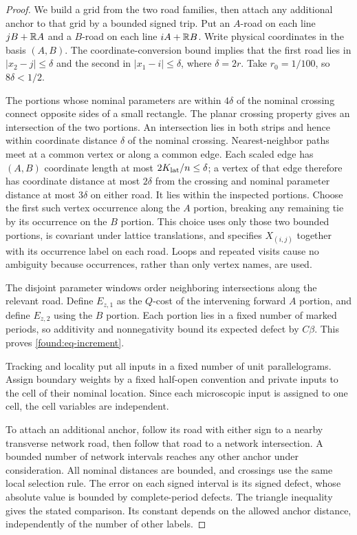 \begin{proof}
We build a grid from the two road families, then attach any additional
anchor to that grid by a bounded signed trip.  Put an $A$-road on each
line $jB+\mathbb R A$ and a $B$-road on each
line $iA+\mathbb R B$.  Write physical coordinates in the basis $(A,B)$.
The coordinate-conversion bound implies that the first road lies in
$|x_2-j|\leq\delta$ and the second in $|x_1-i|\leq\delta$, where
$\delta=2r$.  Take $r_0=1/100$, so $8\delta<1/2$.

The portions whose nominal parameters are within $4\delta$ of the
nominal crossing connect opposite sides of a small rectangle.
The planar crossing property gives an intersection of the two portions.
An intersection lies in both strips and hence within coordinate
distance $\delta$ of the nominal crossing.  Nearest-neighbor paths
meet at a common vertex or along a common edge.  Each scaled edge has
$(A,B)$ coordinate length at most $2K_{\rm lat}/n\leq\delta$; a vertex
of that edge therefore has coordinate distance at most $2\delta$
from the crossing and nominal parameter distance at most $3\delta$
on either road.  It lies within the inspected portions.  Choose the
first such vertex occurrence along the
$A$ portion, breaking any remaining tie by its occurrence on the $B$
portion.  This choice uses only those two bounded portions, is covariant
under lattice translations, and specifies $X_{(i,j)}$ together with its
occurrence label on each road.  Loops and repeated visits cause no
ambiguity because occurrences, rather than only vertex names, are used.

The disjoint parameter windows order neighboring intersections along
the relevant road.  Define $E_{z,1}$ as the $Q$-cost of the intervening
forward $A$ portion, and define $E_{z,2}$ using the $B$ portion.
Each portion lies in a fixed number of marked periods, so additivity
and nonnegativity bound its expected defect by $C\beta$.  This proves
\eqref{found:eq-increment}.

Tracking and locality put all inputs in a fixed number of unit
parallelograms.  Assign boundary weights by a fixed half-open convention
and private inputs to the cell of their nominal location.  Since each
microscopic input is assigned to one cell, the cell variables are
independent.

To attach an additional anchor, follow its road with either sign to
a nearby transverse network road, then follow that road to a network
intersection.  A bounded number of network intervals reaches any
other anchor under consideration.  All nominal distances are bounded,
and crossings use the same local selection rule.  The error on each
signed interval is its signed defect, whose absolute value is bounded
by complete-period defects.  The triangle inequality gives the stated
comparison.  Its constant depends on the allowed anchor distance,
independently of the number of other labels.
\end{proof}

